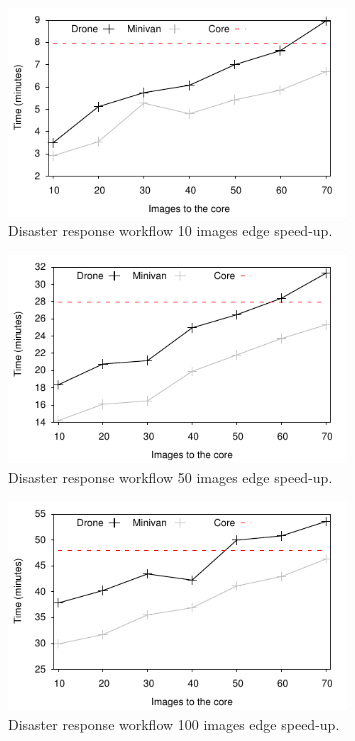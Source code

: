 \begin{figure}[h]
  \centering
  \includegraphics[width=0.8\textwidth]{Results/SmallSpeed}
  \caption{Disaster response workflow 10 images edge speed-up.}
  \label{fig:SmallSpeed}
\end{figure}

\begin{figure}[h]
  \centering
  \includegraphics[width=0.8\textwidth]{Results/MediumSpeed}
  \caption{Disaster response workflow 50 images edge speed-up.}
  \label{fig:MediumSpeed}
\end{figure}

\begin{figure}[h]
  \centering
  \includegraphics[width=0.8\textwidth]{Results/BigSpeed}
  \caption{Disaster response workflow 100 images edge speed-up.}
  \label{fig:BigSpeed}
\end{figure}

